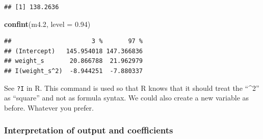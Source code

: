 \documentclass[
]{book}
\newenvironment{Shaded}{\begin{snugshade}}{\end{snugshade}}
\newcommand{\AttributeTok}[1]{\textcolor[rgb]{0.13,0.29,0.53}{#1}}
\newcommand{\FloatTok}[1]{\textcolor[rgb]{0.00,0.00,0.81}{#1}}
\newcommand{\FunctionTok}[1]{\textcolor[rgb]{0.13,0.29,0.53}{\textbf{#1}}}
\newcommand{\NormalTok}[1]{#1}
\begin{document}
\begin{verbatim}
## [1] 138.2636
\end{verbatim}

\begin{Shaded}
\begin{Highlighting}[]
\FunctionTok{confint}\NormalTok{(m4}\FloatTok{.2}\NormalTok{, }\AttributeTok{level =} \FloatTok{0.94}\NormalTok{)}
\end{Highlighting}
\end{Shaded}

\begin{verbatim}
##                      3 %       97 %
## (Intercept)   145.954018 147.366836
## weight_s       20.866788  21.962979
## I(weight_s^2)  -8.944251  -7.880337
\end{verbatim}

See \texttt{?I} in R. This command is used so that R knows that it should
treat the ``\^{}2'' as ``square'' and not as formula syntax.
We could also create a new variable as before. Whatever you prefer.

\subsubsection{Interpretation of output and coefficients}\label{interpretation_output_freq_quadratic}
\end{document}

